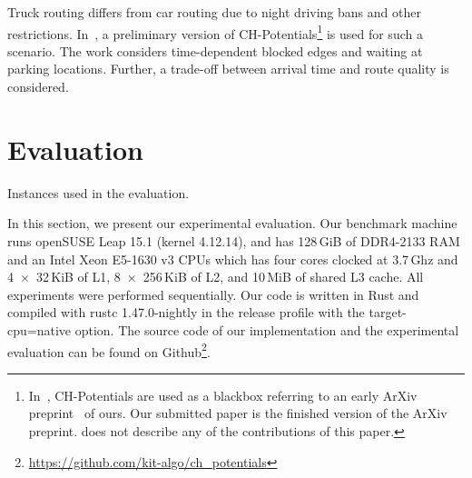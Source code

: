 \documentclass[a4paper,UKenglish,cleveref, autoref, thm-restate]{lipics-v2021}
\begin{document}
Truck routing differs from car routing due to night driving bans and other restrictions.
In~\cite{kswz-erptd-p-20}, a preliminary version of CH-Potentials\footnote{
In~\cite{kswz-erptd-p-20}, CH-Potentials are used as a blackbox referring to an early ArXiv preprint~\cite{strasser2019perfect} of ours.
Our submitted paper is the finished version of the ArXiv preprint.
\cite{kswz-erptd-p-20} does not describe any of the contributions of this paper.
} is used for such a scenario.
The work considers time-dependent blocked edges and waiting at parking locations.
Further, a trade-off between arrival time and route quality is considered.

\section{Evaluation}

\label{sec:experiments}

\begin{table}
\centering
\caption{Instances used in the evaluation.}\label{tab:graphs}

\end{table}

In this section, we present our experimental evaluation.
Our benchmark machine runs openSUSE Leap 15.1 (kernel 4.12.14), and has 128\,GiB of DDR4-2133 RAM and an Intel Xeon E5-1630 v3 CPUs which has four cores clocked at 3.7\,Ghz and 4~$\times$~32\,KiB of L1, 8~$\times$~256\,KiB of L2, and 10\,MiB of shared L3 cache.
All experiments were performed sequentially.
Our code is written in Rust and compiled with rustc 1.47.0-nightly in the release profile with the target-cpu=native option.
The source code of our implementation and the experimental evaluation can be found on Github\footnote{\url{https://github.com/kit-algo/ch_potentials}}.
\end{document}
